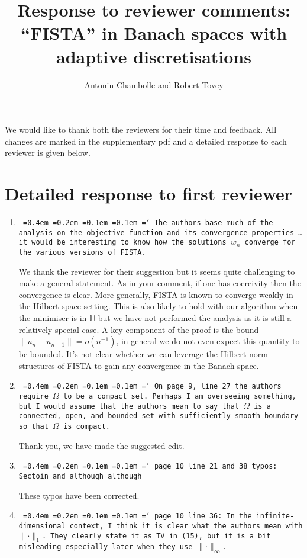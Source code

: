 \documentclass[12pt]{article}
\title{Response to reviewer comments:\\``FISTA'' in Banach spaces with adaptive discretisations}
\author{Antonin Chambolle and Robert Tovey}
\date{\todo{31st October 2021}}
\newcommand*\justify{%
	\fontdimen2\font=0.4em%
	\fontdimen3\font=0.2em%
	\fontdimen4\font=0.1em%
	\fontdimen7\font=0.1em%
	\hyphenchar\font=`\-%
}
\newcommand{\review}[1]{\texttt{\justify{#1}}}
\newcommand{\F}[1]{\mathbb{#1}}
\begin{document}
\maketitle

We would like to thank both the reviewers for their time and feedback. All changes are marked in the supplementary pdf and a detailed response to each reviewer is given below.


\section{Detailed response to first reviewer}

\begin{enumerate}
	\item \review{The authors base much of the analysis on the objective function and its convergence properties \ldots it would be interesting to know how the solutions $w_n$ converge for the various versions of FISTA.} 
	
	We thank the reviewer for their suggestion but it seems quite challenging to make a general statement. As in your comment, if one has coercivity then the convergence is clear. More generally, FISTA is known to converge weakly in the Hilbert-space setting. This is also likely to hold with our algorithm when the minimiser is in $\F H$ but we have not performed the analysis as it is still a relatively special case. A key component of the proof is the bound $\lVert u_n-u_{n-1}\rVert = o(n^{-1})$, in general we do not even expect this quantity to be bounded. It's not clear whether we can leverage the Hilbert-norm structures of FISTA to gain any convergence in the Banach space.
	
	\item \review{On page 9, line 27 the authors require $\Omega$ to be a compact set. Perhaps I am overseeing something, but I would assume that the authors mean to say that $\Omega$ is a connected, open, and bounded set with sufficiently smooth boundary so that $\bar\Omega$ is compact.}
	
	Thank you, we have made the suggested edit.

	\item \review{page 10 line 21 and 38 typos: Sectoin and although although}
	
	These typos have been corrected.
	
	\item \review{page 10 line 36: In the infinite-dimensional context, I think it is clear what the authors mean with $\lVert\cdot\rVert_1$. They clearly state it as TV in (15), but it is a bit misleading especially later when they use $\lVert\cdot\rVert_\infty$.}
	

\end{enumerate}
\end{document}
